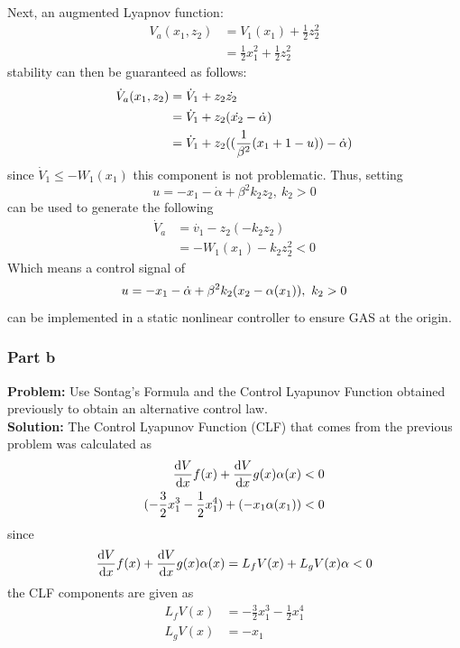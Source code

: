 \documentclass[letter]{article}
\begin{document}
Next, an augmented Lyapnov function:
\begin{align}
	V_a(x_1,z_2)
	&= V_1 (x_1) + \frac{1}{2} z_2^2\\
	&= \frac{1}{2} x_1^2 + \frac{1}{2} z_2^2
\end{align}
stability can then be guaranteed as follows:
\begin{align}
	\dot{V}_a(x_1,z_2)
	&= \dot{V}_1 + z_2 \dot{z_2}\\
	&= \dot{V}_1 + z_2 (\dot{x_2} - \dot{\alpha})\\
	&= \dot{V}_1 + z_2 ((\frac{1}{\beta^2} \qty(x_1 + 1 - u)) - \dot{\alpha})
\end{align}
since $\dot{V}_1 \leq -W_1(x_1)$ this component is not problematic. Thus, setting
$$u = -x_1 - \dot{\alpha} + \beta^2 k_2 z_2, \ k_2 > 0$$
can be used to generate the following
\begin{align}
	\dot{V}_a &= \dot{v_1} - z_2(-k_2 z_2)\\
	&= - W_1(x_1) - k_2 z_2^2 < 0
\end{align}
Which means a control signal of
\begin{equation}
	u =  -x_1 - \dot{\alpha} + \beta^2 k_2 \qty(x_2 - \alpha(x_1)), \ k_2 > 0
\end{equation}
can be implemented in a static nonlinear controller to ensure GAS at the origin.

\newpage
\subsubsection{Part b}
\textbf{Problem:}
Use Sontag's Formula and the Control Lyapunov Function obtained previously to obtain an alternative control law.\\

\noindent
\textbf{Solution:}
The Control Lyapunov Function (CLF) that comes from the previous problem was calculated as
\begin{align}
	\dv{V}{x} f(x) + \dv{V}{x} g(x) \alpha(x) &< 0\\
	(-\frac{3}{2} x_1^3 - \frac{1}{2} x_1^4) + (- x_1 \alpha(x_1)) &< 0
\end{align}
since $$\dv{V}{x} f(x) + \dv{V}{x} g(x) \alpha(x) = L_f V(x) + L_g V(x) \alpha < 0$$
the CLF components are given as
\begin{align}
	L_f V(x) &= -\frac{3}{2} x_1^3 - \frac{1}{2} x_1^4\\
	L_g V(x) &= - x_1
\end{align}
\end{document}
